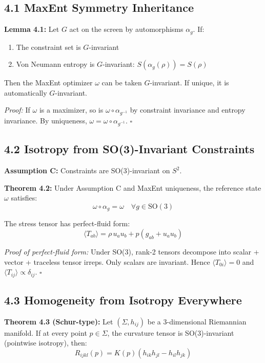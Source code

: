 \subsection{4.1 MaxEnt Symmetry Inheritance}\label{41-maxent-symmetry-inheritance}

\textbf{Lemma 4.1:} Let \(G\) act on the screen by automorphisms \(\alpha_g\). If:

\begin{enumerate}
\def\labelenumi{\arabic{enumi}.}
\tightlist
\item
  The constraint set is \(G\)-invariant
\item
  Von Neumann entropy is \(G\)-invariant: \(S(\alpha_g(\rho)) = S(\rho)\)
\end{enumerate}

Then the MaxEnt optimizer \(\omega\) can be taken \(G\)-invariant. If unique, it is automatically \(G\)-invariant.

\emph{Proof:} If \(\omega\) is a maximizer, so is \(\omega \circ \alpha_{g^{-1}}\) by constraint invariance and entropy invariance. By uniqueness, \(\omega = \omega \circ \alpha_{g^{-1}}\). \(\square\)

\subsection{4.2 Isotropy from SO(3)-Invariant Constraints}\label{42-isotropy-from-so3-invariant-constraints}

\textbf{Assumption C:} Constraints are SO(3)-invariant on \(S^2\).

\textbf{Theorem 4.2:} Under Assumption C and MaxEnt uniqueness, the reference state \(\omega\) satisfies: \[\omega \circ \alpha_g = \omega \quad \forall g \in \text{SO}(3)\]

The stress tensor has perfect-fluid form: \[\langle T_{ab} \rangle = \rho \, u_a u_b + p(g_{ab} + u_a u_b)\]

\emph{Proof of perfect-fluid form:} Under SO(3), rank-2 tensors decompose into scalar + vector + traceless tensor irreps. Only scalars are invariant. Hence \(\langle T_{0i} \rangle = 0\) and \(\langle T_{ij} \rangle \propto \delta_{ij}\). \(\square\)

\subsection{4.3 Homogeneity from Isotropy Everywhere}\label{43-homogeneity-from-isotropy-everywhere}

\textbf{Theorem 4.3 (Schur-type):} Let \((\Sigma, h_{ij})\) be a 3-dimensional Riemannian manifold. If at every point \(p \in \Sigma\), the curvature tensor is SO(3)-invariant (pointwise isotropy), then: \[R_{ijkl}(p) = K(p)(h_{ik}h_{jl} - h_{il}h_{jk})\]

